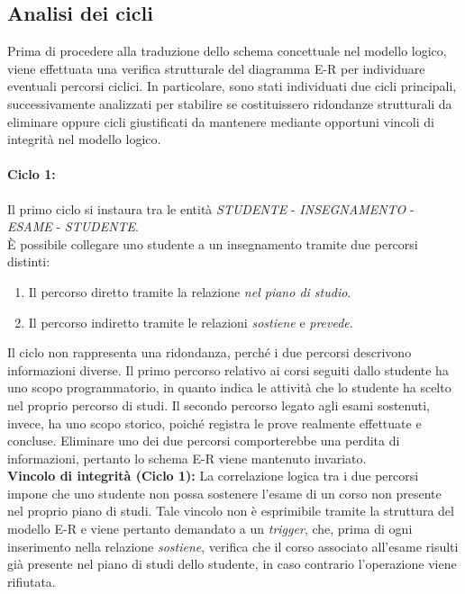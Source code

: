 \subsection{Analisi dei cicli}

Prima di procedere alla traduzione dello schema concettuale nel modello logico, 
viene effettuata una verifica strutturale del diagramma E-R per 
individuare eventuali percorsi ciclici. 
In particolare, sono stati individuati due cicli principali, 
successivamente analizzati per stabilire se costituissero ridondanze strutturali da eliminare 
oppure cicli giustificati da mantenere mediante opportuni vincoli di integrità nel modello logico.

\paragraph{Ciclo 1:}
Il primo ciclo si instaura tra le entità \textit{STUDENTE} - \textit{INSEGNAMENTO} - \textit{ESAME} - \textit{STUDENTE}. \\

\noindent
È possibile collegare uno studente a un insegnamento tramite due percorsi distinti:

\begin{enumerate}
    \item Il percorso diretto tramite la relazione \textit{nel piano di studio}.
    \item Il percorso indiretto tramite le relazioni \textit{sostiene} e \textit{prevede}.
\end{enumerate}

\noindent
Il ciclo non rappresenta una ridondanza, perché i due percorsi descrivono informazioni diverse.
Il primo percorso relativo ai corsi seguiti dallo studente ha uno scopo programmatorio, in quanto indica le attività che lo studente ha scelto nel proprio percorso di studi.
Il secondo percorso legato agli esami sostenuti, invece, ha uno scopo storico, poiché registra le prove realmente effettuate e concluse.
Eliminare uno dei due percorsi comporterebbe una perdita di informazioni, 
pertanto lo schema E-R viene mantenuto invariato. \\

\noindent
\textbf{Vincolo di integrità (Ciclo 1):} La correlazione logica tra i 
due percorsi impone che uno studente non possa sostenere l'esame di un 
corso non presente nel proprio piano di studi. Tale vincolo non è 
esprimibile tramite la struttura del modello E-R e viene pertanto 
demandato a un \textit{trigger}, che, prima di ogni inserimento nella 
relazione \textit{sostiene}, verifica che il corso associato 
all'esame risulti già presente nel piano di studi dello studente, 
in caso contrario l'operazione viene rifiutata.

